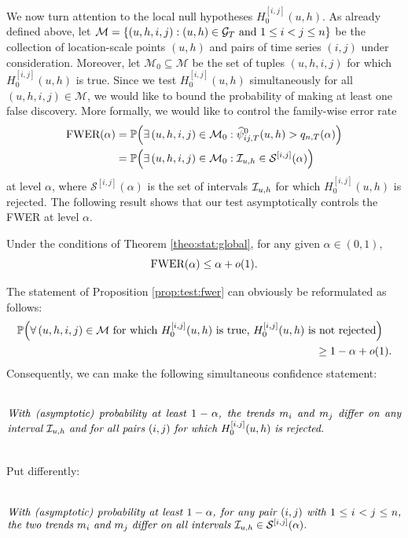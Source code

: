 \documentclass[12pt]{article}
\begin{document}
We now turn attention to the local null hypotheses $H_0^{[i, j]}(u, h)$. As already defined above, let $\mathcal{M} = \{ (u,h,i,j): (u,h) \in \mathcal{G}_T \text{ and } 1 \le i < j \le n \}$ be the collection of location-scale points $(u,h)$ and pairs of time series $(i,j)$ under consideration. Moreover, let $\mathcal{M}_0 \subseteq \mathcal{M}$ be the set of tuples $(u,h,i,j)$ for which $H_0^{[i, j]}(u, h)$ is true. Since we test $H_0^{[i, j]}(u, h)$ simultaneously for all $(u,h,i,j) \in \mathcal{M}$, we would like to bound the probability of making at least one false discovery. More formally, we would like to control the family-wise error rate 
\begin{align*} 
\text{FWER}(\alpha) 
 & = \mathbb{P} \Big(\exists \,  (u,h,i,j) \in \mathcal{M}_0: \widehat{\psi}^0_{ij, T}(u, h) > q_{n,T}(\alpha) \Big) \\
 & = \mathbb{P} \Big(\exists \,  (u,h,i,j) \in \mathcal{M}_0: \mathcal{I}_{u, h} \in \mathcal{S}^{[i, j]}(\alpha) \Big)
\end{align*}
at level $\alpha$, where $\mathcal{S}^{[i, j]}(\alpha)$ is the set of intervals $\mathcal{I}_{u, h}$ for which $H_0^{[i, j]}(u, h)$ is rejected. The following result shows that our test asymptotically controls the FWER at level $\alpha$.
\begin{prop}\label{prop:test:fwer}
Under the conditions of Theorem \ref{theo:stat:global}, for any given $\alpha \in (0,1)$, 
\[ \textnormal{FWER}(\alpha) \leq \alpha + o(1). \]
\end{prop}
The statement of Proposition \ref{prop:test:fwer} can obviously be reformulated as follows: 
\begin{align*}
\mathbb{P}\Big( \forall \, (u,h,i,j) \in \mathcal{M} \text{ for which } H_0^{[i, j]}(u, h) \text{ is true, } H_0^{[i, j]}(u, h) & \text{ is not rejected} \Big) \\ & \quad \ge 1 - \alpha + o(1).
\end{align*}
Consequently, we can make the following simultaneous confidence statement: 
\begin{equation}\label{eq:CS-v1}
\begin{minipage}[c][2.25cm][c]{13cm}
\textit{With (asymptotic) probability at least $1-\alpha$, the trends $m_i$ and $m_j$ differ on any interval $\interval$ and for all pairs $(i,j)$ for which $H_0^{[i, j]}(u, h)$ is rejected.}
\end{minipage}
\end{equation}
Put differently:
\begin{equation}\label{eq:CS-v2}
\begin{minipage}[c][2.25cm][c]{13cm}
\textit{With (asymptotic) probability at least $1-\alpha$, for any pair $(i,j)$ with $1 \le i < j \le n$, the two trends $m_i$ and $m_j$ differ on all intervals $\interval \in \mathcal{S}^{[i, j]}(\alpha)$.}
\end{minipage}
\end{equation}
\end{document}
